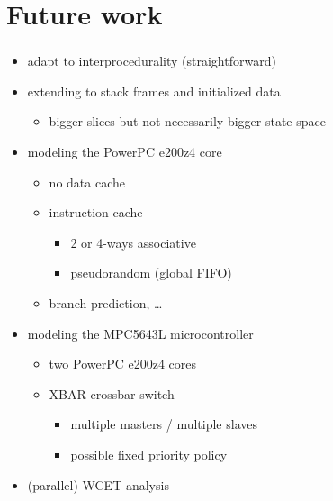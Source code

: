 \documentclass{beamer}
\begin{document}
  
  \section{Future work}
  \begin{frame}
    \frametitle{\secname}
    \tableofcontents[currentsection]
  \end{frame}
  
  \begin{frame}
    \frametitle{\secname}

    \begin{itemize}
      \item adapt to interprocedurality (straightforward)
      \item extending to stack frames and initialized data
      \begin{itemize}
        \item bigger slices but not necessarily bigger state space
      \end{itemize}

      \vspace{1em}
      \item modeling the PowerPC e200z4 core
        \begin{itemize}
          \item no data cache
          \item instruction cache
            \begin{itemize}
              \item 2 or 4-ways associative
              \item pseudorandom (global FIFO)
            \end{itemize}
          \item branch prediction, \dots
        \end{itemize}
      \item modeling the MPC5643L microcontroller
        \begin{itemize}
          \item two PowerPC e200z4 cores
          \item XBAR crossbar switch
            \begin{itemize}
              \item multiple masters / multiple slaves
              \item possible fixed priority policy %
            \end{itemize}
        \end{itemize}

      \vspace{1em}
      \item (parallel) WCET analysis
    \end{itemize}
  \end{frame}
\end{document}
